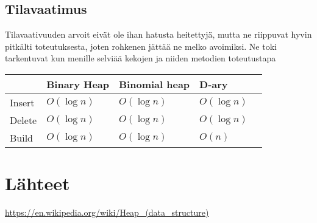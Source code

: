 \documentclass[a4paper,12pt]{article}
\begin{document}
\subsection{Tilavaatimus}
Tilavaativuuden arvoit eivät ole ihan hatusta heitettyjä, mutta ne riippuvat hyvin pitkälti toteutuksesta, joten rohkenen jättää ne melko avoimiksi. Ne toki tarkentuvat kun menille selviää kekojen  ja niiden metodien toteutustapa\\
\begin{tabular}{|l|l|l|l|l|}
\hline
&Binary Heap & Binomial heap & D-ary \\\hline
Insert & $O (\log n)$ & $O (\log n)$ & $O (\log n)$\\\hline
Delete  & $O (\log n)$ & $O (\log n)$ & $O (\log n)$\\\hline
Build & $O (\log n)$ & $O (\log n)$ & $O (n)$\\\hline
\end{tabular}


\section{Lähteet}
\url{https://en.wikipedia.org/wiki/Heap_(data_structure)}
\end{document}

